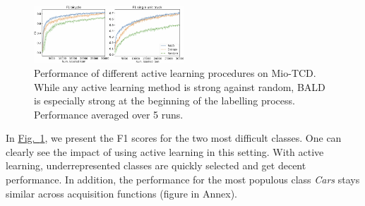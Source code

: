 \documentclass{article}
\newcommand{\figref}[1]{\hyperref[#1]{Fig.\ \ref*{#1}}}
\begin{document}


\begin{figure}
    \centering
    \includegraphics[width=0.5\textwidth]{fig/F1_Miotcd_top.pdf}
    \caption{Performance of different active learning procedures on Mio-TCD. While any active learning method is strong against random, BALD is especially strong at the beginning of the labelling process.  Performance averaged over 5 runs.}
    \label{fig:mioclasses}
\end{figure}

In \figref{fig:mioclasses}, we present the F1 scores for the two most difficult classes. One can clearly see the impact of using active learning in this setting. With active learning, underrepresented classes are quickly selected and get decent performance. In addition, the performance for the most populous class \textit{Cars} stays similar across acquisition functions (figure in Annex). 
\end{document}
